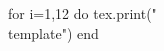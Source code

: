 \documentclass[twoside, 10pt]{article}
\title{}
\date{}
\newcommand{\template}{
\directlua{tex.print(utils.genVersion())}
\noindent
{\large
First Name \rule{6em}{.1pt}\hspace{\stretch{1}} Last Name \rule{6em}{.1pt}\hspace{\stretch{1}} Date \rule{1.5em}{.1pt} -- \rule{1.5em}{.1pt} -- \rule{1.5em}{.1pt}\hspace{\stretch{1}} Period \rule{2em}{.1pt}\hspace{\stretch{1}} Score \rule{2em}{.1pt}
}
\vspace{1em}
\begin{enumerate}
\item ({\textbf{Be Precise}}) Score: \rule{2em}{.4pt} 

Consider the ordered sequence
\[
\directlua{
s = {};
table.insert(s, utils.genRandom(-10, 10))
for i = 1, 9 do
	table.insert(s, utils.genRandom(s[i]+1, s[i]+10))
	tex.print(s[i] .. ",\\ ")
end
tex.print(s[10])
}
\]
Apply the binary search to find \directlua{tex.print(utils.genRandom(s[1], s[10]))} in the sequence. In each step, indicate the number that you looked at, and the subsequence you will use in the next step. If you find the number, return the position of the number in the original sequence; otherwise, return \textit{null}. 
\begin{center}
\renewcommand{\arraystretch}{3}
\begin{tabular}{cc}
Number to Compare & Next Subsequence\\
\rule{4em}{.4pt}&\rule{20em}{.4pt}\\
\rule{4em}{.4pt}&\rule{20em}{.4pt}\\
\rule{4em}{.4pt}&\rule{20em}{.4pt}\\
\rule{4em}{.4pt}&\rule{20em}{.4pt}\\
\end{tabular}
\end{center}
return: \rule{4em}{.4pt}
\item ({\textbf{Argue}}) Score: \rule{2em}{.4pt} 
\begin{enumerate}
\item Suppose the length of an ordered sequence is $n$. Explain how you will estimate the number of iterations it takes to find a number with the binary search to find a particular number in the sequence, even for the worst case.
\clearpage
\item Line $r$ in the $xy$-plane has a slope $\directlua{tex.print(utils.genRandom(-10, 10, false, false, true))}$ of  and passes through the point $(0,  \directlua{tex.print(utils.genRandom(-10, 10, false, false, true))})$.  Find an equation of line $r$.
\vspace{\stretch{1}}
\item A veterinarian recommends that each day a certain
rabbit should eat $\directlua{tex.print(utils.genRandom(25, 35, false, false, true))}$ calories per pound of the rabbit’s
weight, plus an additional $\directlua{tex.print(utils.genRandom(8, 15, false, false, true))}$ calories. If $c$ is the
total number of calories the veterinarian
recommends the rabbit should eat each day if the
rabbit’s weight is $x$ pounds, find an equation to relate $c$ and $x$.
\vspace{\stretch{1}}
\clearpage
\end{enumerate}
\end{enumerate}
}
\begin{document}
\begin{luacode}
for i=1,12 do
	tex.print("\\template")
end
\end{luacode}
\end{document}
